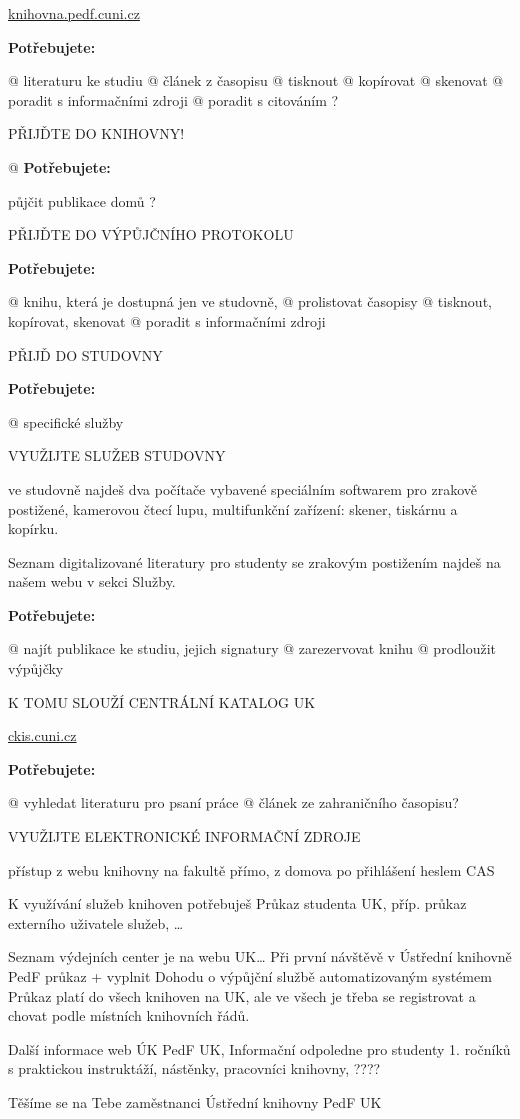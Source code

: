 \documentclass[12]{leaflet}
\newenvironment{page}{\easylist}{\endeasylist\clearpage}
\newcommand\potrebujes{\textbf{Potřebujete:}\par\bigskip}
\newcommand\vykrik[1]{\medskip\par\bgroup\Large\MakeUppercase{#1}\egroup}
\newenvironment{info}{}{}
\begin{document}
\raggedright
\begin{page}
  \uklogo[64pt]
  \vfill
  \url{knihovna.pedf.cuni.cz}
\end{page}
\begin{page}
 
\potrebujes
@ literaturu ke studiu
@ článek z časopisu
@ tisknout 
@ kopírovat
@ skenovat
@ poradit s informačními zdroji
@ poradit s citováním ?


\vykrik{přijďte do knihovny!}

@ \potrebujes půjčit publikace domů ?

\vykrik{přijďte do Výpůjčního protokolu}

\end{page}
\begin{page}
\potrebujes 
@ knihu, která je dostupná jen ve studovně,
@ prolistovat časopisy
@ tisknout, kopírovat, skenovat
@ poradit s informačními zdroji 
\vykrik{přijď do Studovny}


\potrebujes 

@ specifické služby

\vykrik{Využijte služeb studovny}

\begin{info}
ve studovně najdeš dva počítače vybavené speciálním softwarem pro zrakově
postižené, kamerovou čtecí lupu, multifunkční
zařízení: skener, tiskárnu a kopírku. 

Seznam digitalizované literatury pro studenty se zrakovým postižením najdeš na
našem webu v sekci Služby.
\end{info}

\potrebujes 
@ najít publikace ke studiu, jejich signatury
@ zarezervovat knihu
@ prodloužit výpůjčky

\vykrik{k tomu slouží Centrální katalog UK}

          \url{ckis.cuni.cz}

\potrebujes 
@ vyhledat literaturu pro psaní práce
@ článek ze zahraničního časopisu?
\vykrik{využijte elektronické informační zdroje} 

přístup z webu knihovny na fakultě přímo, z domova po přihlášení heslem CAS

\end{page}

\begin{page}
K využívání služeb knihoven potřebuješ  Průkaz studenta UK, příp. průkaz externího uživatele služeb, …

Seznam výdejních center je na webu UK…
Při první návštěvě v Ústřední knihovně PedF  
průkaz + vyplnit Dohodu o výpůjční službě automatizovaným systémem
Průkaz platí do všech knihoven na UK, ale ve všech je třeba se registrovat a chovat podle místních knihovních řádů.

Další informace 
web ÚK PedF UK, Informační odpoledne pro studenty 1. ročníků s praktickou instruktáží, nástěnky, pracovníci knihovny, ????



Těšíme se na Tebe
zaměstnanci Ústřední knihovny PedF UK
\end{page}  
\end{document}

